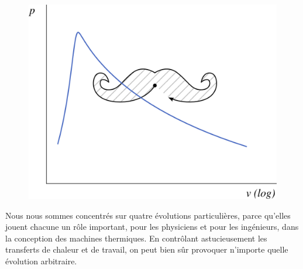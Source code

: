 		\begin{figure}
			\begin{center}
				\includegraphics[width=\pvdiagramwidth]{images/pv_lv_moustache.png}
			\end{center}
			\label{fig_lv_pv_moustache}
		\end{figure}
		
		Nous nous sommes concentrés sur quatre évolutions particulières, parce qu’elles jouent chacune un rôle important, pour les physiciens et pour les ingénieurs, dans la conception des machines thermiques. En contrôlant astucieusement les transferts de chaleur et de travail, on peut bien sûr provoquer n’importe quelle évolution arbitraire.

